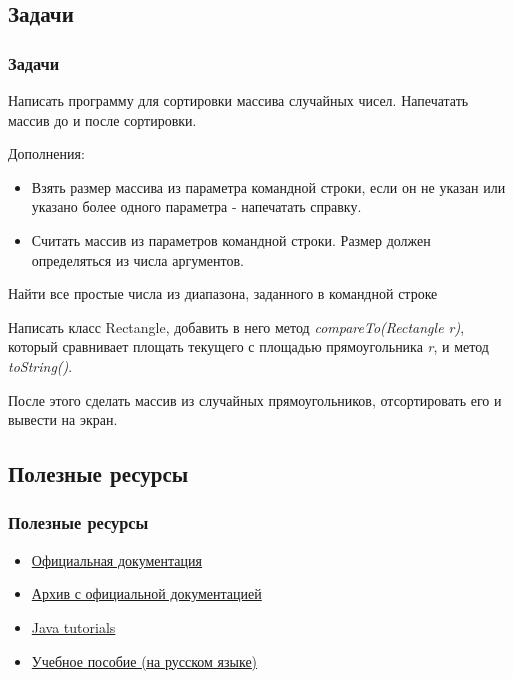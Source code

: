 \subsection{Задачи}
\begin{frame}[fragile]
	\frametitle{Задачи}

	\begin{enumerate}
		\begin{item}
			Написать программу для сортировки массива случайных чисел. Напечатать массив до и после сортировки.

			Дополнения:
			\begin{itemize}
				\item{Взять размер массива из параметра командной строки, если он не указан или указано более одного параметра - напечатать справку.}
				\item{Считать массив из параметров командной строки. Размер должен определяться из числа аргументов.}
			\end{itemize}
		\end{item}
		\begin{item}
			Найти все простые числа из диапазона, заданного в командной строке 
		\end{item}
		\begin{item}
			Написать класс Rectangle, добавить в него метод \textit{compareTo(Rectangle r)}, который сравнивает площать текущего
			с площадью прямоугольника \textit{r}, и метод \textit{toString()}.
			
			После этого сделать массив из случайных прямоугольников, отсортировать его и вывести на экран.

		\end{item}

	\end{enumerate}
\end{frame}

\subsection{Полезные ресурсы}
\begin{frame}
	\frametitle{Полезные ресурсы}

	\begin{itemize}
	\item{\href{http://docs.oracle.com/javase/6/docs/}{Официальная документация}}
	\item{\href{http://www.oracle.com/technetwork/java/javase/documentation/java-se-7-doc-download-435117.html}{Архив с официальной документацией}}
	\item{\href{http://docs.oracle.com/javase/tutorial/}{Java tutorials}}
	\item{\href{http://www.javable.com/tutorials/fesunov/}{Учебное пособие (на русском языке)}}
	\end{itemize}
\end{frame}

